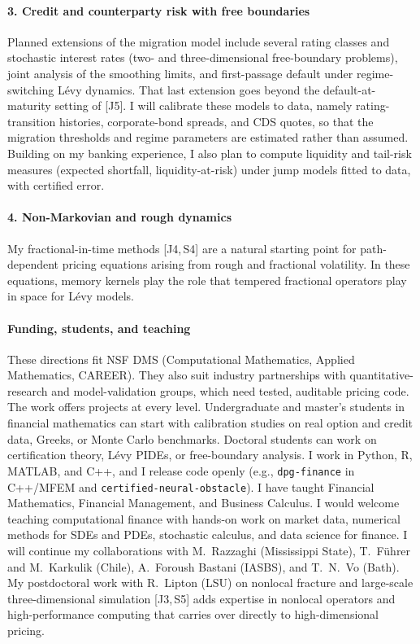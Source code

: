 \documentclass[11pt]{article}
\newcommand{\rc}[1]{\textcolor{accent}{[#1]}}
\begin{document}
\paragraph{3. Credit and counterparty risk with free boundaries}
Planned extensions of the migration model include several rating classes
and stochastic interest rates (two- and three-dimensional free-boundary
problems), joint analysis of the smoothing limits, and first-passage
default under regime-switching L\'evy dynamics. That last extension goes
beyond the default-at-maturity setting of \rc{J5}. I will calibrate these
models to data, namely rating-transition histories, corporate-bond
spreads, and CDS quotes, so that the migration thresholds and regime
parameters are estimated rather than assumed. Building on my banking
experience, I also plan to compute liquidity and tail-risk measures
(expected shortfall, liquidity-at-risk) under jump models fitted to data,
with certified error.

\paragraph{4. Non-Markovian and rough dynamics}
My fractional-in-time methods \rc{J4,\,S4} are a natural starting point
for path-dependent pricing equations arising from rough and fractional
volatility. In these equations, memory kernels play the role that tempered
fractional operators play in space for L\'evy models.

\paragraph{Funding, students, and teaching}
These directions fit NSF DMS (Computational Mathematics, Applied
Mathematics, CAREER). They also suit industry partnerships with
quantitative-research and model-validation groups, which need tested,
auditable pricing code. The work offers projects at every level.
Undergraduate and master's students in financial mathematics can start
with calibration studies on real option and credit data, Greeks, or Monte
Carlo benchmarks. Doctoral students can work on certification theory,
L\'evy PIDEs, or free-boundary analysis. I work in Python, R, MATLAB, and
C++, and I release code openly (e.g., \texttt{dpg-finance} in C++/MFEM and
\texttt{certified-neural-obstacle}). I have taught Financial Mathematics,
Financial Management, and Business Calculus. I would welcome teaching
computational finance with hands-on work on market data, numerical
methods for SDEs and PDEs, stochastic calculus, and data science for
finance. I will continue my collaborations with M.~Razzaghi (Mississippi
State), T.~F\"uhrer and M.~Karkulik (Chile), A.~Foroush Bastani (IASBS),
and T.~N.~Vo (Bath). My postdoctoral work with R.~Lipton (LSU) on nonlocal
fracture and large-scale three-dimensional simulation \rc{J3,\,S5} adds
expertise in nonlocal operators and high-performance computing that
carries over directly to high-dimensional pricing.
\end{document}
